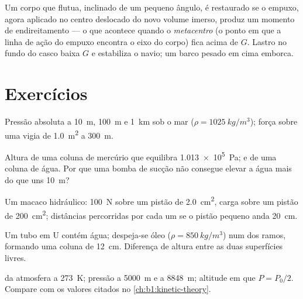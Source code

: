 \begin{remark}[Estabilidade]\label{rem:b1:fluid-statics:stability}
Um corpo que flutua, inclinado de um pequeno ângulo, é restaurado se o
empuxo, agora aplicado no centro deslocado do novo volume imerso, produz
um momento de endireitamento --- o que acontece quando o \emph{metacentro} (o
ponto em que a linha de ação do empuxo encontra o eixo do corpo) fica acima
de $G$. Lastro no fundo do casco baixa $G$ e estabiliza o navio; um barco
pesado em cima emborca.
\end{remark}

\section{Exercícios}

\begin{exercise}[$\star$]\label{exo:b1:fluid-statics:1}
Pressão absoluta a \qty{10}{m}, \qty{100}{m} e \qty{1}{km} sob o mar
($\rho = \qty{1025}{kg/m^3}$); força sobre uma vigia de \qty{1.0}{m^2} a
\qty{300}{m}.
\end{exercise}

\begin{exercise}[$\star$]\label{exo:b1:fluid-statics:2}
Altura de uma coluna de mercúrio que equilibra \qty{1.013e5}{Pa}; e de uma coluna de água.
Por que uma bomba de sucção não consegue elevar a água mais do que uns \qty{10}{m}?
\end{exercise}

\begin{exercise}[$\star$]\label{exo:b1:fluid-statics:3}
Um macaco hidráulico: \qty{100}{N} sobre um pistão de \qty{2.0}{cm^2}, carga
sobre um pistão de \qty{200}{cm^2}; distâncias percorridas por cada um se o
pistão pequeno anda \qty{20}{cm}.
\end{exercise}

\begin{exercise}[$\star$]\label{exo:b1:fluid-statics:4}
Um tubo em U contém água; despeja-se óleo ($\rho = \qty{850}{kg/m^3}$) num
dos ramos, formando uma coluna de \qty{12}{cm}. Diferença de altura entre as
duas superfícies livres.
\end{exercise}

\begin{exercise}[$\star\star$]\label{exo:b1:fluid-statics:5}
 da atmosfera a \qty{273}{K}; pressão a \qty{5000}{m}
e a \qty{8848}{m}; altitude em que $P = P_0/2$. Compare com os
valores citados no \cref{ch:b1:kinetic-theory}.
\end{exercise}

